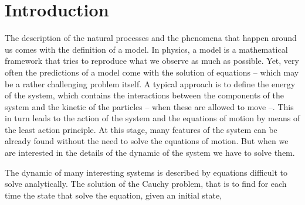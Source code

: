 \chapter{Introduction}
The description of the natural processes and the phenomena that happen around us comes with the definition of a model. In physics, a model is a mathematical framework that tries to reproduce what we observe as much as possible. Yet, very often the predictions of a model come with the solution of equations -- which may be a rather challenging problem itself. A typical approach is to define the energy of the system, which contains the interactions between the components of the system and the kinetic of the particles -- when these are allowed to move --. This in turn leads to the action of the system and the equations of motion by means of the least action principle. At this stage, many features of the system can be already found without the need to solve the equations of motion. 
But when we are interested in the details of the dynamic of the system we have to solve them.

The dynamic of many interesting systems is described by equations difficult to solve analytically. The solution of the Cauchy problem, that is to find for each time the state that solve the equation, given an initial state,